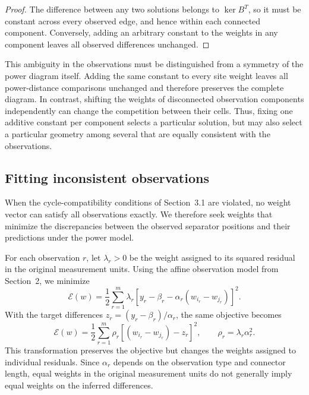 \begin{proof}
The difference between any two solutions belongs to $\ker B^T$, so it must be constant across every observed edge, and hence within each connected component. Conversely, adding an arbitrary constant to the weights in any component leaves all observed differences unchanged.
\end{proof}

This ambiguity in the observations must be distinguished from a symmetry of the power diagram itself. Adding the same constant to every site weight leaves all power-distance comparisons unchanged and therefore preserves the complete diagram. In contrast, shifting the weights of disconnected observation components independently can change the competition between their cells. Thus, fixing one additive constant per component selects a particular solution, but may also select a particular geometry among several that are equally consistent with the observations.

\subsection{Fitting inconsistent observations}

When the cycle-compatibility conditions of Section~3.1 are violated, no weight vector can satisfy all observations exactly. We therefore seek weights that minimize the discrepancies between the observed separator positions and their predictions under the power model.

For each observation $r$, let $\lambda_r>0$ be the weight assigned to its squared residual in the original measurement units. Using the affine observation model from Section~2, we minimize
\begin{equation}
\mathcal E(w)=\frac12\sum_{r=1}^{m}
\lambda_r\left[
y_r-\beta_r-\alpha_r(w_{i_r}-w_{j_r})
\right]^2.
\label{eq:measured-least-squares}
\end{equation}
With the target differences $z_r=(y_r-\beta_r)/\alpha_r$, the same objective becomes
\begin{equation}
\boxed{
\mathcal E(w)=\frac12\sum_{r=1}^{m}
\rho_r\left[(w_{i_r}-w_{j_r})-z_r\right]^2,
\qquad \rho_r=\lambda_r\alpha_r^2.
}
\label{eq:difference-least-squares}
\end{equation}
This transformation preserves the objective but changes the weights assigned to individual residuals. Since $\alpha_r$ depends on the observation type and connector length, equal weights in the original measurement units do not generally imply equal weights on the inferred differences.

